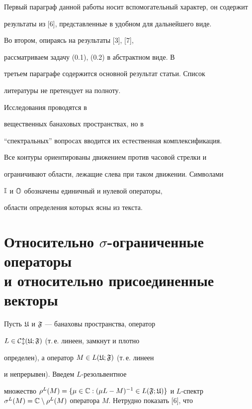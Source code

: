 Первый параграф данной работы носит вспомогательный характер, он содержит


результаты из [6], представленные в удобном для дальнейшего виде.


Во втором, опираясь на результаты [3], [7],


рассматриваем задачу (0.1), (0.2) в абстрактном виде. В


третьем параграфе содержится основной результат статьи. Список


литературы не претендует на полноту.





Исследования проводятся в


вещественных банаховых пространствах, но в 


``спектральных'' вопросах вводится их естественная комплексификация.


Все контуры ориентированы движением против часовой стрелки и


ограничивают области, лежащие слева при таком движении. Символами


$\Bbb I$ и $\Bbb O$ обозначены единичный и нулевой операторы,


области определения которых ясны из текста.








\section{Относительно $\sigma$-ограниченные операторы\protect \\


и относительно присоединенные векторы}





Пусть $\frak U$ и $\frak F$ --- банаховы пространства, оператор


$L\in \cal C l(\frak U;\frak F)$ (т.\,е. линеен, замкнут и плотно


определен), а оператор $M\in L(\frak U;\frak F)$ (т.\,е. линеен


и непрерывен). Введем $L$-резольвентное


множество $\rho^{L}(M)=\{\mu\in \Bbb C:(\mu L-M)^{-1}\in


L(\frak F;\frak U)\}$ и $L$-спектр $\sigma^{L}(M)=\Bbb


C\setminus\rho^{L}(M)$ оператора $M$. Нетрудно показать [6], что


